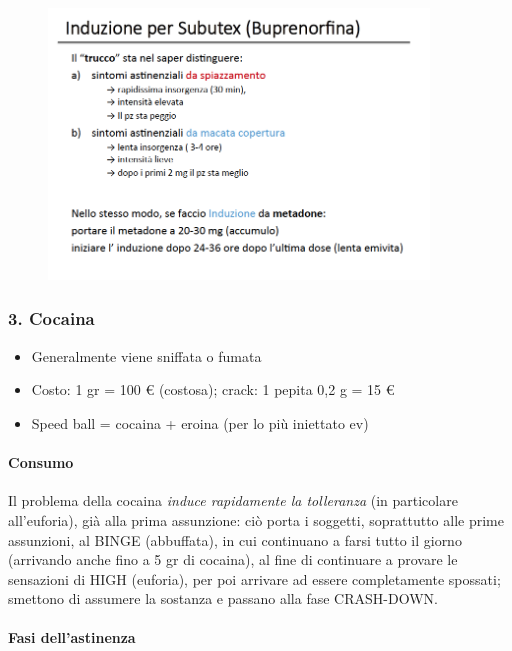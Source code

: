 \begin{figure}[!ht]
\centering
	\includegraphics[width=0.9\textwidth]{017/image17.png}
\end{figure}


\subsubsection{3. Cocaina}

\begin{itemize}
\item
  Generalmente viene sniffata o fumata
\item
  Costo: 1 gr = 100 \euro{} (costosa); crack: 1 pepita 0,2 g = 15
  \euro{}
\item
  Speed ball = cocaina + eroina (per lo più iniettato ev)
\end{itemize}

\paragraph{Consumo}

Il problema della cocaina \emph{induce rapidamente la tolleranza} (in
particolare all'euforia), già alla prima assunzione: ciò porta i
soggetti, soprattutto alle prime assunzioni, al BINGE (abbuffata), in
cui continuano a farsi tutto il giorno (arrivando anche fino a 5 gr di
cocaina), al fine di continuare a provare le sensazioni di HIGH
(euforia), per poi arrivare ad essere completamente spossati; smettono
di assumere la sostanza e passano alla fase CRASH-DOWN.

\paragraph{Fasi dell'astinenza}

